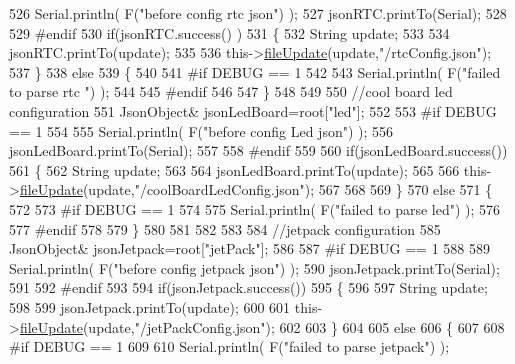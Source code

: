 \begin{DoxyCode}
526     Serial.println( F(\textcolor{stringliteral}{"before config rtc json"}) );
527     jsonRTC.printTo(Serial);
528 
529 \textcolor{preprocessor}{#endif}
530     \textcolor{keywordflow}{if}(jsonRTC.success() )
531     \{
532         String update;
533 
534         jsonRTC.printTo(update);
535 
536         this->\hyperlink{class_cool_file_system_a13f2958f5b87757c31fc53797a30d23a}{fileUpdate}(update,\textcolor{stringliteral}{"/rtcConfig.json"});           
537     \}
538     \textcolor{keywordflow}{else}
539     \{
540     
541 \textcolor{preprocessor}{    #if DEBUG == 1 }
542 
543         Serial.println( F(\textcolor{stringliteral}{"failed to parse rtc "}) );
544     
545 \textcolor{preprocessor}{    #endif}
546 
547     \}
548     
549     
550         \textcolor{comment}{//cool board led configuration}
551         JsonObject& jsonLedBoard=root[\textcolor{stringliteral}{"led"}];
552     
553 \textcolor{preprocessor}{#if DEBUG == 1 }
554 
555     Serial.println( F(\textcolor{stringliteral}{"before config Led json"}) );
556     jsonLedBoard.printTo(Serial);
557 
558 \textcolor{preprocessor}{#endif}
559 
560     \textcolor{keywordflow}{if}(jsonLedBoard.success())
561     \{   
562         String update;
563     
564         jsonLedBoard.printTo(update);
565 
566         this->\hyperlink{class_cool_file_system_a13f2958f5b87757c31fc53797a30d23a}{fileUpdate}(update,\textcolor{stringliteral}{"/coolBoardLedConfig.json"});      
567 
568     
569     \}
570     \textcolor{keywordflow}{else}
571     \{
572     
573 \textcolor{preprocessor}{    #if DEBUG == 1 }
574 
575         Serial.println( F(\textcolor{stringliteral}{"failed to parse led"}) );
576     
577 \textcolor{preprocessor}{    #endif }
578 
579     \}
580         
581 
582     
583 
584     \textcolor{comment}{//jetpack configuration}
585         JsonObject& jsonJetpack=root[\textcolor{stringliteral}{"jetPack"}];
586 
587 \textcolor{preprocessor}{#if DEBUG == 1 }
588 
589     Serial.println( F(\textcolor{stringliteral}{"before config jetpack json"}) );
590     jsonJetpack.printTo(Serial);
591 
592 \textcolor{preprocessor}{#endif}
593 
594     \textcolor{keywordflow}{if}(jsonJetpack.success())
595     \{
596     
597         String update;
598     
599         jsonJetpack.printTo(update);
600 
601         this->\hyperlink{class_cool_file_system_a13f2958f5b87757c31fc53797a30d23a}{fileUpdate}(update,\textcolor{stringliteral}{"/jetPackConfig.json"});       
602 
603     \}
604 
605     \textcolor{keywordflow}{else}
606     \{
607     
608 \textcolor{preprocessor}{    #if DEBUG == 1 }
609 
610         Serial.println( F(\textcolor{stringliteral}{"failed to parse jetpack"}) ); 

\end{DoxyCode}
